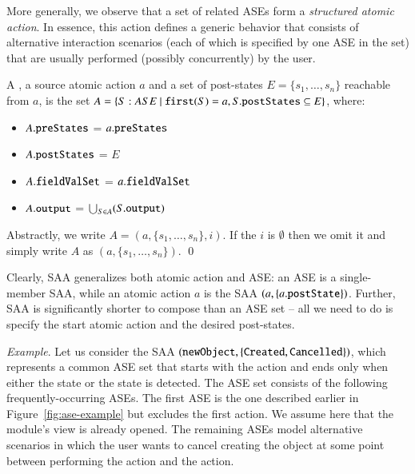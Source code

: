 More generally, we observe that a set of related ASEs form a \textit{structured atomic action}. In essence, this action defines a generic behavior that consists of alternative interaction scenarios (each of which is specified by one ASE in the set) that are usually performed (possibly concurrently) by the user.
%
\begin{definition} \label{def:saa}
	A , \wrt a source atomic action $ a $ and a set of post-states $ E = \{ s_{1},\dots,s_{n} \} $ reachable from $a$, is the set $ A = \{S: ASE ~|~ \func{first}(S) = a, S.\attribn{postStates} \subseteq E \} $, where:
  \begin{itemize}
  \item $A.{\tt preStates}$ = $a.{\tt preStates}$
  \item $A.{\tt postStates}$ = $E$
  \item $A.{\tt fieldValSet}$ = $a.{\tt fieldValSet}$
  \item $A.{\tt output}$ = $\bigcup_{S \in A} (S.{\tt output})$
  \end{itemize}

  Abstractly, we write $ A = (a, \{ s_{1},\dots,s_{n} \}, i) $. If the  $i$ is $\emptyset$ then we omit it and simply write $A$ as $(a, \{ s_{1},\dots,s_{n} \})$. \qed
\end{definition}

Clearly, SAA generalizes both atomic action and ASE: an ASE is a single-member SAA, while an atomic action $ a $ is the SAA 
%
$ (a, \{ a.{\tt postState} \}) $.
%
Further, SAA is significantly shorter to compose than an ASE set -- all we need to do is specify the start atomic action and the desired post-states.

 
\textit{Example}. Let us consider the SAA $ ({\tt newObject}, \{ {\tt Created},{\tt Cancelled} \}) $, which represents a common ASE set that starts with the action  and ends only when either the state  or the state  is detected. The ASE set consists of the following frequently-occurring ASEs. The 
first ASE is the one described earlier in Figure~\ref{fig:ase-example} but excludes the first action. We assume here that the module's view is already opened. The remaining ASEs model alternative scenarios in which the user wants to cancel creating the object at some point between performing the  action and the  action.
%

